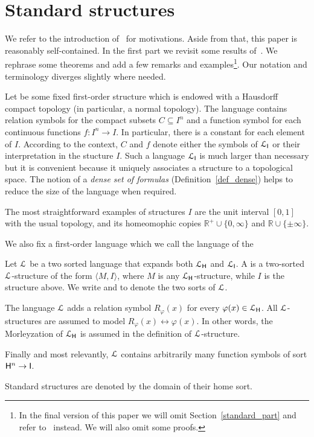 \documentclass[10pt,oneside]{amsproc}
\renewcommand*{\emph}[1]{%
   \smash{\tikz[baseline]\node[rectangle, fill=teal!25, rounded corners, inner xsep=0.5ex, inner ysep=0.2ex, anchor=base, minimum height = 2.7ex]{\strut #1};}}
\begin{document}
\section{Standard structures}\label{uno}


We refer to the introduction of~\cite{clcl} for motivations.
Aside from that, this paper is reasonably self-contained.
In the first part we revisit some results of~\cite{clcl}.
We rephrase some theorems and add a few remarks and examples\footnote{In the final version of this paper we will omit Section~\ref{standard_part} and refer to~\cite{clcl} instead. We will also omit some proofs.}.
Our notation and terminology diverges slightly where needed.

\def\ceq#1#2#3{\parbox[t]{23ex}{$\displaystyle #1$}\parbox{6ex}{\hfil $#2$}{$\displaystyle #3$}}

Let \emph{$I$\/} be some fixed first-order structure which is endowed with a Hausdorff compact topology (in particular, a normal topology).
The language \emph{${\EuScript L}_{\sf I}$\/} contains relation symbols for the compact subsets $C\subseteq I^n$ and a function symbol for each continuous functions $f:I^n\to I$.
In particular, there is a constant for each element of $I$.
According to the context, $C$ and $f$ denote either the symbols of ${\EuScript L}_{\sf I}$ or their interpretation in the stucture $I$.
Such a language ${\EuScript L}_{\sf I}$ is much larger than necessary but it is convenient because it uniquely associates a structure to a topological space.
The notion of a \textit{dense set of formulas\/} (Definition~\ref{def_dense}) helps to reduce the size of the language when required.

The most straightforward examples of structures $I$ are the unit interval $[0,1]$ with the usual topology, and its homeomophic copies $\mathds{R}^+\cup\{0,\infty\}$ and $\mathds{R}\cup\{\pm\infty\}$.

We also fix a first-order language \emph{${\EuScript L}_{\sf H}$\/} which we call the language of the \emph{home sort.}

\begin{definition}\label{def_0}
  Let ${\EuScript L}$ be a two sorted language that expands both ${\EuScript L}_{\sf H}$ and ${\EuScript L}_{\sf I}$.
  A \emph{standard structure\/} is a two-sorted ${\EuScript L}$-structure of the form $\langle M,I\rangle$, where $M$ is any ${\EuScript L}_{\sf H}$-structure, while $I$ is the structure above.
  We write \emph{${\sf H}$} and \emph{${\sf I}$\/} to denote the two sorts of ${\EuScript L}$.
  
  The language ${\EuScript L}$ adds a relation symbol $R_{\varphi}(x)$ for every $\varphi(x)\in {\EuScript L}_{\sf H}$.
  All ${\EuScript L}$-structures are assumed to model $R_{\varphi}(x)\leftrightarrow\varphi(x)$. 
  In other words, the Morleyzation of ${\EuScript L}_{\sf H}$ is assumed in the definition of ${\EuScript L}$-structure.
  
  Finally and most relevantly, ${\EuScript L}$ contains arbitrarily many function symbols of sort ${\sf H}^n\to {\sf I}$.

  Standard structures are denoted by the domain of their home sort.
\end{definition}
\end{document}
